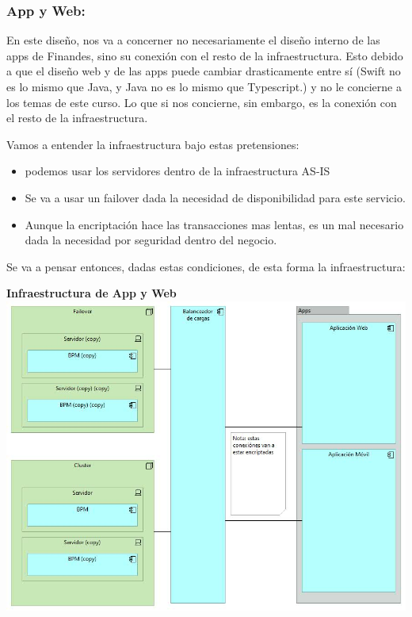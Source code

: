 \documentclass[a4paper]{article}
\begin{document}
\subsubsection{App y Web:}

En este diseño, nos va a concerner no necesariamente el diseño interno de las apps de Finandes,
sino su conexión con el resto de la infraestructura. Esto debido a que el diseño web y de las apps
puede cambiar drasticamente entre sí (Swift no es lo mismo que Java, y Java no es lo mismo que Typescript.)
y no le concierne a los temas de este curso. Lo que si nos concierne, sin embargo, es la conexión con el resto
de la infraestructura.

Vamos a entender la infraestructura bajo estas pretensiones:
\begin{itemize}
    \item podemos usar los servidores dentro de la infraestructura AS-IS
    \item Se va a usar un failover dada la necesidad de disponibilidad para este servicio.
    \item Aunque la encriptación hace las transacciones mas lentas, es un mal necesario dada la necesidad por seguridad dentro del negocio.
\end{itemize}

Se va a pensar entonces, dadas estas condiciones, de esta forma la infraestructura:

\begin{center}
    \textbf{Infraestructura de App y Web}
    \includegraphics[scale=0.56]{webapp-diagram.jpg}    
\end{center}

\end{document}
